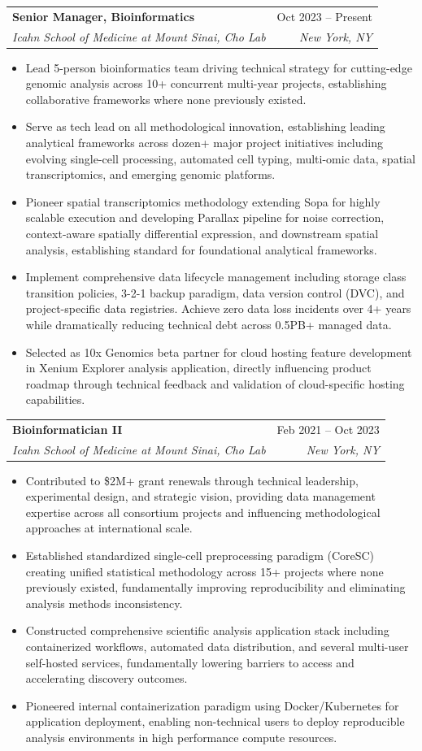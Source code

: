 \documentclass[letterpaper,11pt]{article}
\makeatletter
\newcommand{\resumeItem}[1]{
  \item\small{
    {#1 \vspace{-2pt}}
  }
}
\newcommand{\resumeSubheading}[4]{
  \vspace{-2pt}\item
    \begin{tabular*}{0.97\textwidth}[t]{l@{\extracolsep{\fill}}r}
      \textbf{#1} & #2 \\
      \textit{\small#3} & \textit{\small #4} \\
    \end{tabular*}\vspace{-7pt}
}
\newcommand{\resumeItemListStart}{\begin{itemize}}
\newcommand{\resumeItemListEnd}{\end{itemize}\vspace{-5pt}}
\makeatother
\begin{document}
    \resumeSubheading
      {Senior Manager, Bioinformatics}{Oct 2023 -- Present}
      {Icahn School of Medicine at Mount Sinai, Cho Lab}{New York, NY}
      \resumeItemListStart
        \resumeItem{Lead 5-person bioinformatics team driving technical strategy for cutting-edge genomic analysis across 10+ concurrent multi-year projects, establishing collaborative frameworks where none previously existed.}
        \resumeItem{Serve as tech lead on all methodological innovation, establishing leading analytical frameworks across dozen+ major project initiatives including evolving single-cell processing, automated cell typing, multi-omic data, spatial transcriptomics, and emerging genomic platforms.}
        \resumeItem{Pioneer spatial transcriptomics methodology extending Sopa for highly scalable execution and developing Parallax pipeline for noise correction, context-aware spatially differential expression, and downstream spatial analysis, establishing standard for foundational analytical frameworks.}
        \resumeItem{Implement comprehensive data lifecycle management including storage class transition policies, 3-2-1 backup paradigm, data version control (DVC), and project-specific data registries. Achieve zero data loss incidents over 4+ years while dramatically reducing technical debt across 0.5PB+ managed data.}
        \resumeItem{Selected as 10x Genomics beta partner for cloud hosting feature development in Xenium Explorer analysis application, directly influencing product roadmap through technical feedback and validation of cloud-specific hosting capabilities.}
      \resumeItemListEnd

    \resumeSubheading
      {Bioinformatician II}{Feb 2021 -- Oct 2023}
      {Icahn School of Medicine at Mount Sinai, Cho Lab}{New York, NY}
      \resumeItemListStart
        \resumeItem{Contributed to \$2M+ grant renewals through technical leadership, experimental design, and strategic vision, providing data management expertise across all consortium projects and influencing methodological approaches at international scale.}
        \resumeItem{Established standardized single-cell preprocessing paradigm (CoreSC) creating unified statistical methodology across 15+ projects where none previously existed, fundamentally improving reproducibility and eliminating analysis methods inconsistency.}
        \resumeItem{Constructed comprehensive scientific analysis application stack including containerized workflows, automated data distribution, and several multi-user self-hosted services, fundamentally lowering barriers to access and accelerating discovery outcomes.}
        \resumeItem{Pioneered internal containerization paradigm using Docker/Kubernetes for application deployment, enabling non-technical users to deploy reproducible analysis environments in high performance compute resources.}
      \resumeItemListEnd
\end{document}
